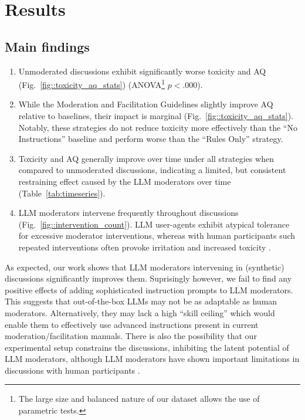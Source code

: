%

\section{Results}
\label{sec:results}

\subsection{Main findings}



\begin{enumerate}
    \item Unmoderated discussions exhibit significantly worse toxicity and \ac{AQ} (Fig.~\ref{fig::toxicity_aq_stats}) (ANOVA\footnote{The large size and balanced nature of our dataset allows the use of parametric tests.} $p<.000$).

    \item  While the Moderation and Facilitation Guidelines slightly improve \ac{AQ} relative to baselines, their impact is marginal (Fig.~\ref{fig::toxicity_aq_stats}). Notably, these strategies do not reduce toxicity more effectively than the “No Instructions” baseline and perform worse than the “Rules Only” strategy.

    \item Toxicity and \ac{AQ} generally improve over time under all strategies when compared to unmoderated discussions, indicating a limited, but consistent restraining effect caused by the \ac{LLM} moderators over time (Table~\ref{tab:timeseries}).

    \item \ac{LLM} moderators intervene frequently throughout discussions (Fig.~\ref{fig::intervention_count}). \ac{LLM} user-agents exhibit atypical tolerance for excessive moderator interventions, whereas with human participants such repeated interventions often provoke irritation and increased toxicity \cite{schaffner_community_guidelines, make_reddit_great, proactive_moderation, cresci_pesonalized_interventions}.
\end{enumerate}

As expected, our work shows that \ac{LLM} moderators intervening in (synthetic) discussions significantly improves them. Suprisingly however, we fail to find any positive effects of adding sophisticated instruction prompts to \ac{LLM} moderators. This suggests that out-of-the-box \acp{LLM} may not be as adaptable as human moderators. Alternatively, they may lack a high “skill ceiling” which would enable them to effectively use advanced instructions present in current moderation/facilitation manuals. There is also the possibility that our experimental setup constrains the discussions, inhibiting the latent potential of \ac{LLM} moderators, although \ac{LLM} moderators have shown important limitations in discussions with human participants \cite{cho-etal-2024-language}.


